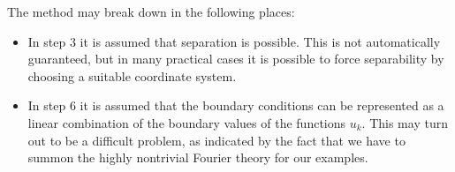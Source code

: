 The method may break down in the following places:
\begin{itemize}
\item
In step 3 it is assumed that separation is possible.
This is not automatically guaranteed, but in many practical cases it
is possible to force separability by choosing a suitable coordinate
system.
\item
In step 6 it is assumed that the boundary conditions can be
represented as a linear combination of the boundary values of
the functions $u_k$.
This may turn out to be a difficult problem, as indicated by the
fact that we have to summon the highly nontrivial Fourier theory
for our examples.
\end{itemize}

